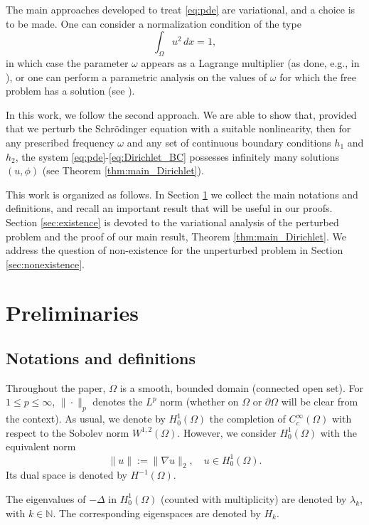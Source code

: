 \documentclass[reqno]{amsart}
\begin{document}
The main approaches developed to treat \eqref{eq:pde} are variational, and a choice is 
to be made. One can consider a normalization condition of the type
\[
 \int_\Omega u^2 \,dx = 1,
\]
in which case the parameter $\omega$ appears as a Lagrange multiplier (as done, e.g., 
in \cite{BenciFortunato1998, PisaniSiciliano2013, AfonsoSiciliano2021}), or one can 
perform a parametric analysis on the values of $\omega$ for which the free problem has 
a solution (see \cite{PisaniSiciliano2007b}).

In this work, we follow the second approach. We are able to show that, provided that we 
perturb the Schr\"odinger equation with a suitable nonlinearity, then for any prescribed 
frequency $\omega$ and any set of continuous boundary conditions $h_1$ and $h_2$, 
the system \eqref{eq:pde}-\eqref{eq:Dirichlet_BC} possesses infinitely many solutions 
$(u, \phi)$ (see Theorem \ref{thm:main_Dirichlet}).

This work is organized as follows. In Section \ref{sec:prelim} we collect the main 
notations and definitions, and recall an important result that will be useful in our 
proofs. Section \ref{sec:existence} is devoted to the variational analysis of the 
perturbed problem and the proof of our main result, Theorem \ref{thm:main_Dirichlet}. 
We address the question of non-existence for the unperturbed problem in 
Section \ref{sec:nonexistence}.

\section{Preliminaries}
\label{sec:prelim}

\subsection{Notations and definitions}

Throughout the paper, $\Omega$ is a smooth, bounded domain (connected open set). 
For $1 \leq p \leq \infty$, $\|\cdot\|_p$ denotes the $L^p$ norm (whether on $\Omega$ 
or $\partial\Omega$ will be clear from the context). As usual, we denote by $H_0^1(\Omega)$ the
completion of $C_c^\infty(\Omega)$ with respect to the Sobolev norm $W^{1, 2}(\Omega)$. 
However, we consider $H_0^1(\Omega)$ with the equivalent norm
\[
 \|u\| := \|\nabla u\|_2, \quad u \in H_0^1(\Omega).
\]
Its dual space is denoted by $H^{-1}(\Omega)$.

The eigenvalues of $- \Delta$ in $H_0^1(\Omega)$ (counted with multiplicity) are 
denoted by $\lambda_k$, with $k \in \mathbb N$. The corresponding eigenspaces are denoted 
by $H_k$.
\end{document}
